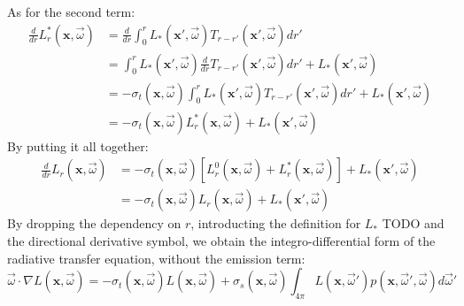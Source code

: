As for the second term:
\begin{equation}
\begin{split}
\frac{d}{dr} L^*_r(\mathbf{x}, \vec{\omega}) &= \frac{d}{dr} \int_0^r L_*(\mathbf{x}', \vec{\omega}) T_{r-r'}(\mathbf{x}', \vec{\omega})  dr' \\
&= \int_0^r L_*(\mathbf{x}', \vec{\omega}) \frac{d}{dr} T_{r-r'}(\mathbf{x}', \vec{\omega})  dr' + L_*(\mathbf{x}', \vec{\omega})
 \\
 &= -\sigma_t(\mathbf{x}, \vec{\omega})  \int_0^r L_*(\mathbf{x}', \vec{\omega}) T_{r-r'}(\mathbf{x}', \vec{\omega})  dr' + L_*(\mathbf{x}', \vec{\omega}) \\
 &= -\sigma_t(\mathbf{x}, \vec{\omega}) L^*_r(\mathbf{x}, \vec{\omega}) + L_*(\mathbf{x}', \vec{\omega})
\end{split}
\end{equation}
By putting it all together:
\begin{equation}
\begin{split}
\frac{d}{dr} L_r(\mathbf{x}, \vec{\omega}) &= -\sigma_t(\mathbf{x}, \vec{\omega}) [L^0_r(\mathbf{x}, \vec{\omega}) + L^*_r(\mathbf{x}, \vec{\omega})] + L_*(\mathbf{x}', \vec{\omega}) \\
&=  -\sigma_t(\mathbf{x}, \vec{\omega}) L_r(\mathbf{x}, \vec{\omega}) +  L_*(\mathbf{x}', \vec{\omega}) 
\end{split}
\end{equation}
By dropping the dependency on $r$, introducting the definition for $L_*$ TODO and the directional derivative symbol, we obtain the integro-differential form of the radiative  transfer equation, without the emission term:
$$\vec{\omega} \cdot \nabla L(\mathbf{x}, \vec{\omega}) = - \sigma_t(\mathbf{x}, \vec{\omega}) L(\mathbf{x}, \vec{\omega}) + \sigma_s(\mathbf{x}, \vec{\omega}) \int_{4\pi} L(\mathbf{x}, \vec{\omega}')  p(\mathbf{x}, \vec{\omega}', \vec{\omega}) d \vec{\omega}'$$
